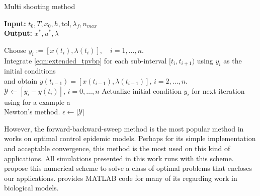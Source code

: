 \begin{algorithm}
  \caption{Multi shooting method } \label{alg:multishooting}
  \begin{flushleft}
    \hspace*{\algorithmicindent} \textbf{Input:} 
    $t_0, T, x_0, h, \text{tol}, \lambda_{f}, n_{max}$ \\
    \hspace*{\algorithmicindent} \textbf{Output:} 
    $x^*, u^*, \lambda$
  \end{flushleft}
  \begin{algorithmic}
        \State 
         Choose $y_i := [x(t_i ), \lambda(t_i )], \quad i = 1,\dots, n$.
        \\
        \State 
          Integrate \eqref{eqn:extended_tpvbp} for each sub-interval 
          $[t_i , t_{i+1})$ using $y_i$ as the initial conditions 
          \\
          \hspace{.98cm}
          and obtain 
          $y(t_{i−1}) = [x(t_{i−1}), \lambda(t_{i−1})]$, 
          $i=2, \dots, n$.
        \\
        \State 
          $\mathcal{Y} \gets [y_i - y(t_i)]$, $i=0, \dots, n$
        \State
          Actualize initial condition $y_i$ for next iteration
          using for a example a
          \\
          \hspace{.98cm}
           Newton's method.
        \State
          $\epsilon \gets |\mathcal{Y}|$  
      \EndWhile
     \EndProcedure
  \end{algorithmic}
\end{algorithm}


  However, the forward-backward-sweep method is the most popular method in 
works on optimal control epidemic models. Perhaps for its simple 
implementation and acceptable convergence, this method is the most used on 
this kind of applications. All simulations presented in this work runs with 
this scheme. \citet{hackbusch1978numerical} propose this numerical scheme to 
solve a class of optimal problems that encloses our  applications.
\citet{lenhart2007optimal} provides MATLAB code for many of its regarding
work in biological models.


